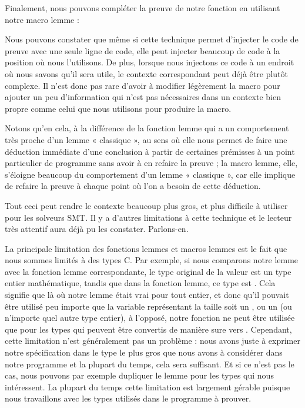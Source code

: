 Finalement, nous pouvons compléter la preuve de notre fonction 
en utilisant notre macro lemme :




Nous pouvons constater que même si cette technique permet d'injecter le code de
preuve avec une seule ligne de code, elle peut injecter beaucoup de code à la
position où nous l'utilisons. De plus, lorsque nous injectons ce code à un endroit
où nous savons qu'il sera utile, le contexte correspondant peut déjà être plutôt
complexe. Il n'est donc pas rare d'avoir à modifier légèrement la macro pour
ajouter un peu d'information qui n'est pas nécessaires dans un contexte bien
propre comme celui que nous utilisons pour produire la macro.


Notons qu'en cela, à la différence de la fonction lemme qui a un comportement
très proche d'un lemme « classique », au sens où elle nous permet de faire une
déduction immédiate d'une conclusion à partir de certaines prémisses à un point
particulier de programme sans avoir à en refaire la preuve ; la macro lemme,
elle, s'éloigne beaucoup du comportement d'un lemme « classique », car elle
implique de refaire la preuve à chaque point où l'on a besoin de cette déduction.


Tout ceci peut rendre le contexte beaucoup plus gros, et plus difficile à utiliser
pour les solveurs SMT. Il y a d'autres limitations à cette technique et le lecteur
très attentif aura déjà pu les constater. Parlons-en.





La principale limitation des fonctions lemmes et macros lemmes
est le fait que nous sommes limités à des types C. Par exemple, si nous
comparons notre lemme  avec la
fonction lemme correspondante, le type original de la valeur
 est un type entier mathématique, tandis que dans la
fonction lemme, ce type est . Cela signifie que là
où notre lemme était vrai pour tout entier, et donc qu'il pouvait être utilisé
peu importe que la variable représentant la taille soit un ,
ou un  (ou n'importe quel autre type entier), à l'opposé,
notre fonction ne peut être utilisée que pour les types qui peuvent être
convertis de manière sure vers . Cependant, cette limitation
n'est généralement pas un problème : nous avons juste à exprimer notre
spécification dans le type le plus gros que nous avons à considérer dans notre
programme et la plupart du temps, cela sera suffisant. Et si ce n'est pas le cas,
nous pouvons par exemple dupliquer le lemme pour les types qui nous intéressent.
La plupart du temps cette limitation est largement gérable puisque nous
travaillons avec les types utilisés dans le programme à prouver.


